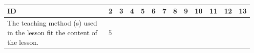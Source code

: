 \documentclass[paper=a4,justified,a4paper]{tufte-handout}
\begin{document}
\begin{longtable}[]{@{}lllllllllllll@{}}
\toprule
\begin{minipage}[b]{0.07\columnwidth}\raggedright
ID\strut
\end{minipage} & \begin{minipage}[b]{0.04\columnwidth}\raggedright
2\strut
\end{minipage} & \begin{minipage}[b]{0.04\columnwidth}\raggedright
3\strut
\end{minipage} & \begin{minipage}[b]{0.04\columnwidth}\raggedright
4\strut
\end{minipage} & \begin{minipage}[b]{0.04\columnwidth}\raggedright
5\strut
\end{minipage} & \begin{minipage}[b]{0.04\columnwidth}\raggedright
6\strut
\end{minipage} & \begin{minipage}[b]{0.04\columnwidth}\raggedright
7\strut
\end{minipage} & \begin{minipage}[b]{0.04\columnwidth}\raggedright
8\strut
\end{minipage} & \begin{minipage}[b]{0.04\columnwidth}\raggedright
9\strut
\end{minipage} & \begin{minipage}[b]{0.07\columnwidth}\raggedright
10\strut
\end{minipage} & \begin{minipage}[b]{0.07\columnwidth}\raggedright
11\strut
\end{minipage} & \begin{minipage}[b]{0.07\columnwidth}\raggedright
12\strut
\end{minipage} & \begin{minipage}[b]{0.07\columnwidth}\raggedright
13\strut
\end{minipage}\tabularnewline
\midrule
\endhead
\begin{minipage}[t]{0.07\columnwidth}\raggedright
\scriptsize The teaching method (s) used in the lesson fit the content
of the lesson.\strut
\end{minipage} & \begin{minipage}[t]{0.04\columnwidth}\raggedright
5\strut
\end{minipage} & \begin{minipage}[t]{0.04\columnwidth}\raggedright

\end{minipage}
\end{longtable}
\end{document}
